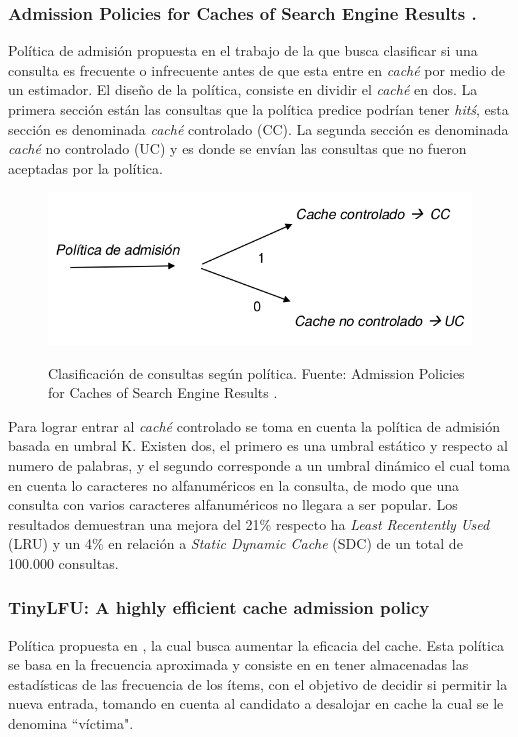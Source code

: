 \documentclass[12pt]{ociamthesis}  %
\begin{document}
\subsubsection{Admission Policies for Caches of Search Engine Results \cite{baeza2007admission}.}

Política de admisión propuesta en el trabajo de \cite{baeza2007admission} la que busca clasificar si una consulta es frecuente o infrecuente antes de que esta entre en \textit{caché} por medio de un estimador. El diseño de la política, consiste en dividir el \textit{caché} en dos. La primera sección están las consultas que la política predice podrían tener \textit{hitś}, esta sección es denominada \textit{caché} controlado (CC). La segunda sección es denominada \textit{caché} no controlado (UC) y es donde se envían las consultas que no fueron aceptadas por la política. 

\begin{figure}[!htb]
	\centering
	\includegraphics[width=12cm]{Imagenes/PoliticaAdmi_cache_CC_UC}\\
	\caption{Clasificación de consultas según política. Fuente: Admission Policies for Caches of Search Engine Results \cite{baeza2007admission}.}
	\label{clasificacion_consulta_cc_uc}
\end{figure}

Para lograr entrar al \textit{caché} controlado se toma en cuenta la política de admisión basada en umbral K. Existen dos, el primero es una umbral estático y respecto al numero de palabras, y el segundo corresponde a un umbral dinámico el cual toma en cuenta lo caracteres no alfanuméricos en la consulta, de modo que una consulta con varios caracteres alfanuméricos no llegara a ser popular. Los resultados demuestran una mejora del 21\% respecto ha \textit{Least Recentently Used} (LRU) y un 4\% en relación a \textit{Static Dynamic Cache} (SDC) de un total de 100.000 consultas.\\

\clearpage


\subsubsection{TinyLFU: A highly efficient cache admission policy}
Política propuesta en \cite{einziger2014tinylfu}, la cual busca aumentar la eficacia del cache. Esta política se basa en la frecuencia aproximada y consiste en en tener almacenadas las estadísticas de las frecuencia de los ítems, con el objetivo de decidir si permitir la nueva entrada, tomando en cuenta al candidato a desalojar en cache la cual se le denomina ``víctima".\\
\end{document}
